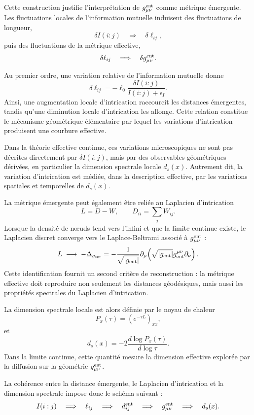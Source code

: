 \documentclass[11pt]{article}
\begin{document}
Cette construction justifie l'interpr\'etation de $g_{\mu\nu}^{\rm ent}$ comme
m\'etrique \'emergente. Les fluctuations locales de l'information mutuelle induisent
des fluctuations de longueur,
\[
\delta I(i:j)
\quad\Longrightarrow\quad
\delta \ell_{ij},
\]
puis des fluctuations de la m\'etrique effective,
\[
\delta \ell_{ij}
\quad\Longrightarrow\quad
\delta g_{\mu\nu}^{\rm ent}.
\]

Au premier ordre, une variation relative de l'information mutuelle donne
\[
\delta \ell_{ij}
=
-\ell_0
\frac{\delta I(i:j)}{I(i:j)+\epsilon_I}.
\]
Ainsi, une augmentation locale d'intrication raccourcit les distances \'emergentes,
tandis qu'une diminution locale d'intrication les allonge. Cette relation constitue
le m\'ecanisme g\'eom\'etrique \'el\'ementaire par lequel les variations d'intrication
produisent une courbure effective.

Dans la th\'eorie effective continue, ces variations microscopiques ne sont pas
d\'ecrites directement par $\delta I(i:j)$, mais par des observables g\'eom\'etriques
d\'eriv\'ees, en particulier la dimension spectrale locale $d_s(x)$. Autrement dit,
la variation d'intrication est m\'edi\'ee, dans la description effective, par les
variations spatiales et temporelles de $d_s(x)$.

La m\'etrique \'emergente peut \'egalement \^etre reli\'ee au Laplacien d'intrication
\[
L=D-W,
\qquad
D_{ii}=\sum_j W_{ij}.
\]
Lorsque la densit\'e de n\oe{}uds tend vers l'infini et que la limite continue existe,
le Laplacien discret converge vers le Laplace-Beltrami associ\'e \`a $g_{\mu\nu}^{\rm ent}$ :
\[
L
\;\longrightarrow\;
-\Delta_{g_{\rm ent}}
=
-\frac{1}{\sqrt{|g_{\rm ent}|}}
\partial_\mu
\!\left(
\sqrt{|g_{\rm ent}|}
g_{\rm ent}^{\mu\nu}
\partial_\nu
\right).
\]
Cette identification fournit un second crit\`ere de reconstruction : la m\'etrique
effective doit reproduire non seulement les distances g\'eod\'esiques, mais aussi les
propri\'et\'es spectrales du Laplacien d'intrication.

La dimension spectrale locale est alors d\'efinie par le noyau de chaleur
\[
P_x(\tau)
=
\left(e^{-\tau L}\right)_{xx},
\]
et
\[
d_s(x)
=
-2\frac{d\log P_x(\tau)}{d\log\tau}.
\]
Dans la limite continue, cette quantit\'e mesure la dimension effective explor\'ee
par la diffusion sur la g\'eom\'etrie $g_{\mu\nu}^{\rm ent}$.

La coh\'erence entre la distance \'emergente, le Laplacien d'intrication et la dimension
spectrale impose donc le sch\'ema suivant :
\[
I(i:j)
\quad\Longrightarrow\quad
\ell_{ij}
\quad\Longrightarrow\quad
d_{ij}^{\rm ent}
\quad\Longrightarrow\quad
g_{\mu\nu}^{\rm ent}
\quad\Longrightarrow\quad
d_s(x).
\]
\end{document}
